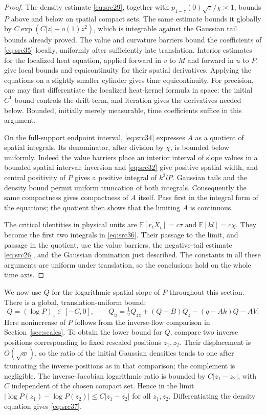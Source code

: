 \documentclass[11pt,a4paper]{article}
\numberwithin{equation}{section}
\theoremstyle{definition}
\theoremstyle{remark}
\newcommand{\E}{\mathbb E}
\begin{document}
\begin{proof}
The density estimate \eqref{eq:src29}, together with
$p_{1-\tau}(0)\sqrt\tau/\chi\asymp1$, bounds $P$ above and below on
spatial compact sets.  The same estimate bounds it globally by
$C\exp(C|z|+o(1)z^2)$, which is integrable against the Gaussian tail
bounds already proved.  The value and curvature barriers bound the
coefficients of \eqref{eq:src35} locally, uniformly after sufficiently
late translation.  Interior estimates for the localized heat equation,
applied forward in $v$ to $M$ and forward in $u$ to $P$, give local
bounds and equicontinuity for their spatial derivatives.  Applying the
equations on a slightly smaller cylinder gives time equicontinuity.
For precision, one may first differentiate the localized heat-kernel
formula in space: the initial $C^1$ bound controls the drift term, and
iteration gives the derivatives needed below.  Bounded, initially
merely measurable, time coefficients suffice in this argument.

On the full-support endpoint interval, \eqref{eq:src34} expresses $A$
as a quotient of spatial integrals.  Its denominator, after division
by $\chi$, is bounded below uniformly.  Indeed the value barriers
place an interior interval of slope values in a bounded spatial
interval; inversion and \eqref{eq:src32} give positive spatial width,
and central positivity of $P$ gives a positive integral of $k^2lP$.
Gaussian tails and the density bound permit uniform truncation of both
integrals.  Consequently the same compactness gives compactness of
$A$ itself.  Pass first in the integral form of the equations; the
quotient then shows that the limiting $A$ is continuous.

The critical identities in physical units are
$\E[r_tX_t]=c\tau$ and $\E[kl]=c\chi$.  They become the first two
integrals in \eqref{eq:src36}.  Their passage to the limit, and passage
in the quotient, use the value barriers, the negative-tail estimate
\eqref{eq:src26}, and the Gaussian domination just described.  The
constants in all these arguments are uniform under translation, so
the conclusions hold on the whole time axis.
\end{proof}

We now use $Q$ for the logarithmic spatial slope of $P$ throughout this
section. There is a global, translation-uniform bound:
\begin{equation}
 Q=(\log P)_z\in[-C,0],\qquad
 Q_u=\tfrac12Q_{zz}+(Q-B)Q_z-(q-Ak)Q-AV.
 \label{eq:src37}
\end{equation}
Here nonincrease of $P$ follows from the inverse-flow comparison in
Section~\ref{sec:scales}.  To obtain the lower bound for $Q$, compare
two inverse positions corresponding to fixed rescaled positions
$z_1,z_2$.  Their displacement is $O(\sqrt w)$, so the ratio of the
initial Gaussian densities tends to one after truncating the inverse
positions as in that comparison; the complement is negligible.  The
inverse-Jacobian logarithmic ratio is bounded by $C|z_1-z_2|$, with
$C$ independent of the chosen compact set.  Hence in the limit
$|\log P(z_1)-\log P(z_2)|\le C|z_1-z_2|$ for all $z_1,z_2$.
Differentiating the density equation gives \eqref{eq:src37}.
\end{document}
